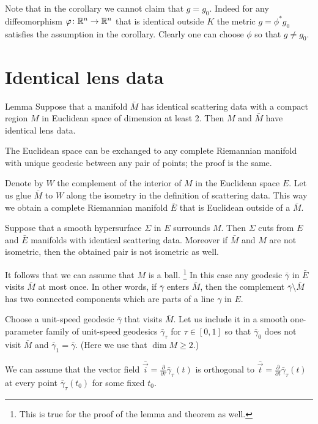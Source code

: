 Note that in the corollary we cannot claim that $g=g_0$.
Indeed for any diffeomorphism $\varphi\colon\mathbb{R}^n\to\mathbb{R}^n$ that is identical outside $K$ the metric $g=\phi^*g_0$ satisfies the assumption in the corollary.
Clearly one can choose $\phi$ so that $g\ne g_0$.


\section{Identical lens data}

\begin{thm}{Lemma}\label{lem:no-delay}
Suppose that a manifold $\bar M$ has identical scattering data with a compact region $M$ in Euclidean space of dimension at least 2.
Then $M$ and $\bar M$ have identical lens data. 
\end{thm}

The Euclidean space can be exchanged to any complete Riemannian manifold with unique geodesic between any pair of points; the proof is the same.

Denote by $W$ the complement of the interior of $M$ in the Euclidean space $E$.
Let us glue $\bar M$ to $W$ along the isometry in the definition of scattering data.
This way we obtain a complete Riemannian manifold $\bar E$ that is Euclidean outside of a $\bar M$.

Suppose that a smooth hypersurface $\Sigma$ in $E$ surrounds $M$.
Then $\Sigma$ cuts from $E$ and $\bar E$ manifolds with identical scattering data.
Moreover if $\bar M$ and $M$ are not isometric,
then the obtained pair is not isometric as well.

It follows that we can assume that $M$ is a ball.%
\footnote{This is true for the proof of the lemma and theorem as well.}
In this case any geodesic $\bar\gamma$ in $\bar E$ visits $\bar M$ at most once.
In other words, if $\bar\gamma$ enters $\bar M$, then the complement $\bar\gamma\setminus \bar M$ has two connected components which are parts of a line $\gamma$ in $E$.


Choose a unit-speed geodesic $\bar\gamma$ that visits $\bar M$.
Let us include it in a smooth one-parameter family of unit-speed geodesics $\bar\gamma_\tau$ for $\tau\in [0,1]$ so that $\bar\gamma_0$ does not visit $\bar M$ and $\bar \gamma_1=\bar \gamma$.
(Here we use that $\dim M\ge 2$.)

We can assume that 
the vector field $\bar{\vec i}
=\tfrac{\partial}{\partial\tau}\bar\gamma_\tau(t)$ is orthogonal to $\bar{\vec t}
=\tfrac{\partial}{\partial t}\bar\gamma_\tau(t)$ at every point $\bar\gamma_\tau(t_0)$ for some fixed $t_0$.

